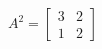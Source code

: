 \documentclass[preview]{standalone}
\begin{document}
\begin{center}
$A^2 = $$\begin{bmatrix}3 & 2 \\ 1 & 2\end{bmatrix}$
\end{center}
\end{document}
